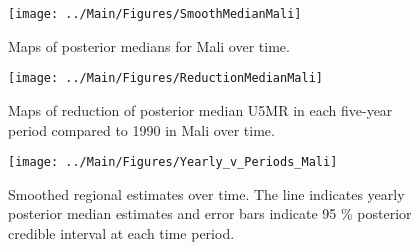 \documentclass[12pt]{article}\usepackage[]{graphicx}\usepackage[]{color}
\newenvironment{knitrout}{}{} %
\begin{document}
\begin{knitrout}
\color{fgcolor}\begin{figure}[bht]

{\centering \texttt{[image: ../Main/Figures/SmoothMedianMali]} 

}

\caption[Maps of posterior medians for Mali  over time]{Maps of posterior medians for Mali  over time.}\label{fig:unnamed-chunk-214}
\end{figure}


\end{knitrout}
\begin{knitrout}
\color{fgcolor}\begin{figure}[bht]

{\centering \texttt{[image: ../Main/Figures/ReductionMedianMali]} 

}

\caption[Maps of reduction of posterior median U5MR in each five-year period compared to 1990 in Mali over time]{Maps of reduction of posterior median U5MR in each five-year period compared to 1990 in Mali over time.}\label{fig:unnamed-chunk-215}
\end{figure}


\end{knitrout}
\begin{knitrout}
\color{fgcolor}\begin{figure}[bht]

{\centering \texttt{[image: ../Main/Figures/Yearly\_v\_Periods\_Mali]} 

}

\caption[Smoothed regional estimates over time]{Smoothed regional estimates over time. The line indicates yearly posterior median estimates and error bars indicate 95 \% posterior credible interval at each time period.}\label{fig:unnamed-chunk-216}
\end{figure}


\end{knitrout}
\end{document}
